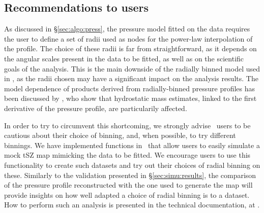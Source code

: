 \subsection{Recommendations to users}


As discussed in \S\ref{sec:algo:press}, the pressure model fitted on the data requires the user to define a set of radii used as nodes for the power-law interpolation of the profile.
The choice of these radii is far from straightforward, as it depends on the angular scales present in the data to be fitted, as well as on the scientific goals of the analysis.
This is the main downside of the radially binned model used in \panco, as the radii chosen may have a significant impact on the analysis results.
The model dependence of products derived from radially-binned pressure profiles has been discussed by \citet{munoz-echeverria_multi-probe_2022}, who show that hydrostatic mass estimates, linked to the first derivative of the pressure profile, are particularily affected.

In order to try to circumvent this shortcoming, we strongly advise \panco\ users to be cautious about their choice of binning, and, when possible, to try different binnings.
We have implemented functions in \panco\ that allow users to easily simulate a mock tSZ map mimicking the data to be fitted.
We encourage users to use this functionality to create such datasets and try out their choices of radial binning on these.
Similarly to the validation presented in \S\ref{sec:simu:results}, the comparison of the pressure profile reconstructed with the one used to generate the map will provide insights on how well adapted a choice of radial binning is to a dataset.
How to perform such an analysis is presented in the technical documentation, at .

